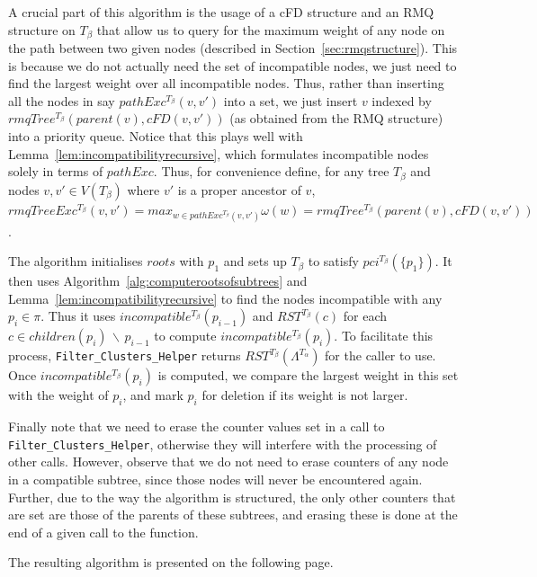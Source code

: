 \documentclass{article}
\newcommand{\leafset}{\Lambda}
\newcommand{\weight}{\omega}
\newcommand{\TA}{T_\alpha}
\newcommand{\TB}{T_\beta}
\begin{document}
    A crucial part of this algorithm is the usage of a cFD structure and an RMQ structure on $\TB$ that allow us to query for the maximum weight of any node on the path between two given nodes (described in Section~\ref{sec:rmqstructure}). This is because we do not actually need the set of incompatible nodes, we just need to find the largest weight over all incompatible nodes. Thus, rather than inserting all the nodes in say $pathExc^{\TB}(v, v')$ into a set, we just insert $v$ indexed by $rmqTree^{\TB}(parent(v), cFD(v, v'))$ (as obtained from the RMQ structure) into a priority queue. Notice that this plays well with Lemma~\ref{lem:incompatibilityrecursive}, which formulates incompatible nodes solely in terms of $pathExc$. Thus, for convenience define, for any tree $\TB$ and nodes $v, v' \in V(\TB)$ where $v'$ is a proper ancestor of $v$, $rmqTreeExc^{\TB}(v, v') = max_{w \in pathExc^{\TB}(v, v')} \weight(w) = rmqTree^{\TB}(parent(v), cFD(v, v'))$.

    The algorithm initialises $roots$ with $p_1$ and sets up $\TB$ to satisfy $pci^{\TB}(\{p_1\})$. It then uses Algorithm~\ref{alg:computerootsofsubtrees} and Lemma~\ref{lem:incompatibilityrecursive} to find the nodes incompatible with any $p_i \in \pi$. Thus it uses $incompatible^{\TB}(p_{i-1})$ and $RST^{\TB}(c)$ for each $c \in children(p_i)\, \backslash\, p_{i-1}$ to compute $incompatible^{\TB}(p_i)$. To facilitate this process, \texttt{Filter\_Clusters\_Helper} returns $RST^{\TB}(\leafset^{\TA})$ for the caller to use. Once $incompatible^{\TB}(p_i)$ is computed, we compare the largest weight in this set with the weight of $p_i$, and mark $p_i$ for deletion if its weight is not larger.

    Finally note that we need to erase the counter values set in a call to \texttt{Filter\_Clusters\_Helper}, otherwise they will interfere with the processing of other calls. However, observe that we do not need to erase counters of any node in a compatible subtree, since those nodes will never be encountered again. Further, due to the way the algorithm is structured, the only other counters that are set are those of the parents of these subtrees, and erasing these is done at the end of a given call to the function.

    The resulting algorithm is presented on the following page.
\end{document}
